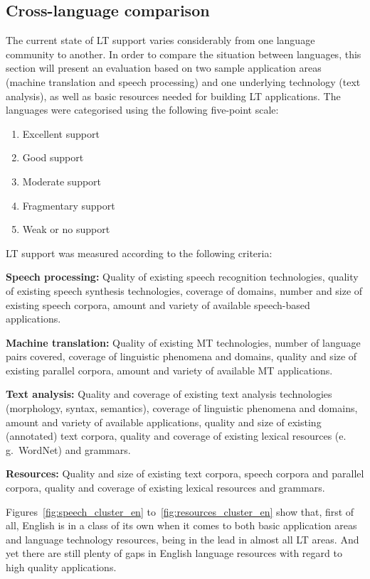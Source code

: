 \begin{multicols}{2}
\subsection{Cross-language comparison}

The current state of LT support varies considerably from one language community to another. In order to compare the situation between languages, this section will present an evaluation based on two sample application areas (machine translation and speech processing) and one underlying technology (text analysis), as well as basic resources needed for building LT applications. The languages were categorised using the following five-point scale: 

\begin{enumerate}
\item Excellent support
\item Good support
\item Moderate support
\item Fragmentary support
\item Weak or no support
\end{enumerate}

LT support was measured according to the following criteria:

\textbf{Speech processing:} Quality of existing speech recognition technologies, quality of existing speech synthesis technologies, coverage of domains, number and size of existing speech corpora, amount and variety of available speech-based applications.

\textbf{Machine translation:} Quality of existing MT technologies, number of language pairs covered, coverage of linguistic phenomena and domains, quality and size of existing parallel corpora, amount and variety of available MT applications.

\textbf{Text analysis:} Quality and coverage of existing text analysis technologies (morphology, syntax, semantics), coverage of linguistic phenomena and domains, amount and variety of available applications, quality and size of existing (annotated) text corpora, quality and coverage of existing lexical resources (e.\,g.~WordNet) and grammars.

\textbf{Resources:} Quality and size of existing text corpora, speech corpora and parallel corpora, quality and coverage of existing lexical resources and grammars.

Figures~\ref{fig:speech_cluster_en} to~\ref{fig:resources_cluster_en}
show that, first of all, English is in a class of its own when it
comes to both basic application areas and language technology
resources, being in the lead in almost all LT areas. And yet there are
still plenty of gaps in English language resources with regard to high
quality applications.


\end{multicols}
